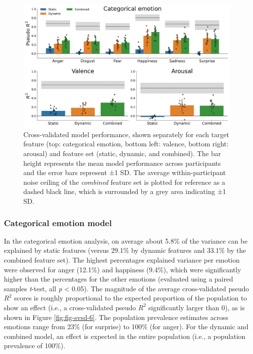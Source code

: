 \documentclass[11pt,american,a4paper,oneside,]{memoir} %
\begin{document}
\begin{figure}
\centering
\includegraphics{_bookdown_files/static-vs-dynamic-files/figures/figure_5.pdf}
\caption{\label{fig:fig-svsd-5}Cross-validated model performance, shown separately for each target feature (top: categorical emotion, bottom left: valence, bottom right: arousal) and feature set (static, dynamic, and combined). The bar height represents the mean model performance across participants and the error bars represent ±1 SD. The average within-participant noise ceiling of the \emph{combined} feature set is plotted for reference as a dashed black line, which is surrounded by a grey area indicating ±1 SD.}
\end{figure}



\hypertarget{categorical-emotion-model}{%
\subsubsection{Categorical emotion model}\label{categorical-emotion-model}}

In the categorical emotion analysis, on average about 5.8\% of the variance can be explained by static features (versus 29.1\% by dynamic features and 33.1\% by the combined feature set). The highest percentages explained variance per emotion were observed for anger (12.1\%) and happiness (9.4\%), which were significantly higher than the percentages for the other emotions (evaluated using a paired samples \emph{t}-test, all \emph{p} \textless{} 0.05). The magnitude of the average cross-validated pseudo \(R^2\) scores is roughly proportional to the expected proportion of the population to show an effect (i.e., a cross-validated pseudo \(R^{2}\) significantly larger than 0), as is shown in Figure \ref{fig:fig-svsd-6}. The population prevalence estimates across emotions range from 23\% (for surprise) to 100\% (for anger). For the dynamic and combined model, an effect is expected in the entire population (i.e., a population prevalence of 100\%).
\end{document}
